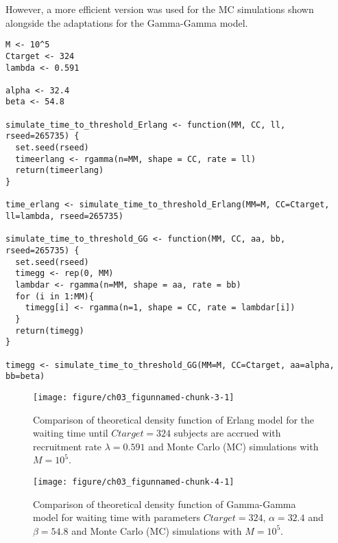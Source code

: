 However, a more efficient version was used for the MC simulations shown alongside the adaptations for the Gamma-Gamma model.

\begin{knitrout}
\color{fgcolor}\begin{kframe}
\begin{verbatim}
M <- 10^5
Ctarget <- 324
lambda <- 0.591

alpha <- 32.4
beta <- 54.8

simulate_time_to_threshold_Erlang <- function(MM, CC, ll, rseed=265735) {
  set.seed(rseed)
  timeerlang <- rgamma(n=MM, shape = CC, rate = ll)
  return(timeerlang)
}

time_erlang <- simulate_time_to_threshold_Erlang(MM=M, CC=Ctarget, ll=lambda, rseed=265735)

simulate_time_to_threshold_GG <- function(MM, CC, aa, bb, rseed=265735) {
  set.seed(rseed)
  timegg <- rep(0, MM)
  lambdar <- rgamma(n=MM, shape = aa, rate = bb)
  for (i in 1:MM){
    timegg[i] <- rgamma(n=1, shape = CC, rate = lambdar[i])
  }
  return(timegg)
}

timegg <- simulate_time_to_threshold_GG(MM=M, CC=Ctarget, aa=alpha, bb=beta) 
\end{verbatim}
\end{kframe}
\end{knitrout}

\begin{figure}
\begin{knitrout}
\color{fgcolor}
\texttt{[image: figure/ch03\_figunnamed-chunk-3-1]} 
\end{knitrout}
\caption{Comparison of theoretical density function of Erlang model for the waiting time until $Ctarget = 324$ subjects are accrued with recruitment rate $\lambda = 0.591$ and Monte Carlo (MC) simulations with $M=10^5$.}
\label{fig:3_3}
\end{figure}


\begin{figure}
\begin{knitrout}
\color{fgcolor}
\texttt{[image: figure/ch03\_figunnamed-chunk-4-1]} 
\end{knitrout}
\caption{Comparison of theoretical density function of Gamma-Gamma model for waiting time with parameters $Ctarget = 324$, $\alpha = 32.4$ and $\beta = 54.8$ and Monte Carlo (MC) simulations with $M=10^5$.}
\label{fig:3_4}
\end{figure}






